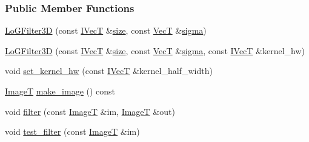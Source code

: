 \subsubsection*{Public Member Functions}
\begin{DoxyCompactItemize}
\item 
\hyperlink{classboxxer_1_1LoGFilter3D_a84c56c8dbaec1a442e061f1d54ed1981}{Lo\+G\+Filter3D} (const \hyperlink{classboxxer_1_1GaussFIRFilter_a0083c8c9ab6032dd458b4dc93852c2b8}{I\+VecT} \&\hyperlink{classboxxer_1_1GaussFIRFilter_ac0d4e19bb2be3e8913e77283e7e4317e}{size}, const \hyperlink{classboxxer_1_1LoGFilter3D_ad4ce9fa2ad4134b954162e2597fb6a48}{VecT} \&\hyperlink{classboxxer_1_1GaussFIRFilter_a66ced06c688fd544d5f1f8be39aa2125}{sigma})
\item 
\hyperlink{classboxxer_1_1LoGFilter3D_a1a855e4acb2ad962eb80e5dfa4e764e4}{Lo\+G\+Filter3D} (const \hyperlink{classboxxer_1_1GaussFIRFilter_a0083c8c9ab6032dd458b4dc93852c2b8}{I\+VecT} \&\hyperlink{classboxxer_1_1GaussFIRFilter_ac0d4e19bb2be3e8913e77283e7e4317e}{size}, const \hyperlink{classboxxer_1_1LoGFilter3D_ad4ce9fa2ad4134b954162e2597fb6a48}{VecT} \&\hyperlink{classboxxer_1_1GaussFIRFilter_a66ced06c688fd544d5f1f8be39aa2125}{sigma}, const \hyperlink{classboxxer_1_1GaussFIRFilter_a0083c8c9ab6032dd458b4dc93852c2b8}{I\+VecT} \&kernel\+\_\+hw)
\item 
void \hyperlink{classboxxer_1_1LoGFilter3D_ab7b66d1b3262dfe6033ab58d9221f7e2}{set\+\_\+kernel\+\_\+hw} (const \hyperlink{classboxxer_1_1GaussFIRFilter_a0083c8c9ab6032dd458b4dc93852c2b8}{I\+VecT} \&kernel\+\_\+half\+\_\+width)
\item 
\hyperlink{classboxxer_1_1LoGFilter3D_a735a23ffea030e730398d32a49d2b223}{ImageT} \hyperlink{classboxxer_1_1LoGFilter3D_a0c7867d14ded5d7bda15dae3e207e69d}{make\+\_\+image} () const 
\item 
void \hyperlink{classboxxer_1_1LoGFilter3D_ab28a7d1e2e8a4af00a05810922a6c54f}{filter} (const \hyperlink{classboxxer_1_1LoGFilter3D_a735a23ffea030e730398d32a49d2b223}{ImageT} \&im, \hyperlink{classboxxer_1_1LoGFilter3D_a735a23ffea030e730398d32a49d2b223}{ImageT} \&out)
\item 
void \hyperlink{classboxxer_1_1LoGFilter3D_a11358de783c69458a79baaa3c688be93}{test\+\_\+filter} (const \hyperlink{classboxxer_1_1LoGFilter3D_a735a23ffea030e730398d32a49d2b223}{ImageT} \&im)
\end{DoxyCompactItemize}
